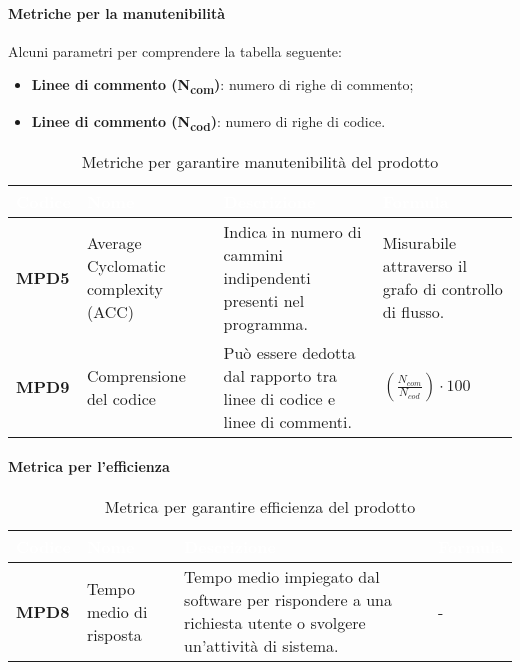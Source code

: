 \paragraph{Metriche per la manutenibilità}
Alcuni parametri per comprendere la tabella seguente:
\begin{itemize}
	\item \textbf{Linee di commento (N\textsubscript{com})}: numero di righe di commento;
	\item \textbf{Linee di commento (N\textsubscript{cod})}: numero di righe di codice.
\end{itemize}
\renewcommand{\arraystretch}{1.5}
\renewcommand\extrarowheight{1.5pt}
\begin{longtable}{C{1.5cm} C{4.5cm} C{5.5cm} C{5cm}}
		\textcolor{white}{\textbf{Codice}} & 
		\textcolor{white}{\textbf{Nome}} & 
		\textcolor{white}{\textbf{Descrizione}} & 
		\textcolor{white}{\textbf{Formula}} \\
		\endfirsthead
	    \endfoot
	    \caption{Metriche per garantire manutenibilità del prodotto}
	    \endlastfoot
		\textbf{MPD5} & 
		Average Cyclomatic complexity (ACC) & 
		Indica in numero di cammini indipendenti presenti nel programma. & Misurabile attraverso il grafo di controllo di flusso.\\
		\textbf{MPD9} & 
		Comprensione del codice & 
		Può essere dedotta dal rapporto tra linee di codice e linee di commenti. &
		$(\frac{N_{com}}{N_{cod}}) \cdot 100 $ \\
		
\end{longtable}
\paragraph{Metrica per l'efficienza}
\renewcommand{\arraystretch}{1.5}
\renewcommand\extrarowheight{1.5pt}
\begin{longtable}{C{1.5cm} C{4.5cm} C{5.5cm} C{5cm}}
		\textcolor{white}{\textbf{Codice}} & 
		\textcolor{white}{\textbf{Nome}} & 
		\textcolor{white}{\textbf{Descrizione}} & 
		\textcolor{white}{\textbf{Formula}} \\
		\endfirsthead
	    \endfoot
	    \caption{Metrica per garantire efficienza del prodotto}
	    \endlastfoot
		\textbf{MPD8} & 
		Tempo medio di risposta & 
		Tempo medio impiegato dal software per rispondere a una richiesta utente o svolgere un'attività di sistema. &
		- \\
\end{longtable}		
